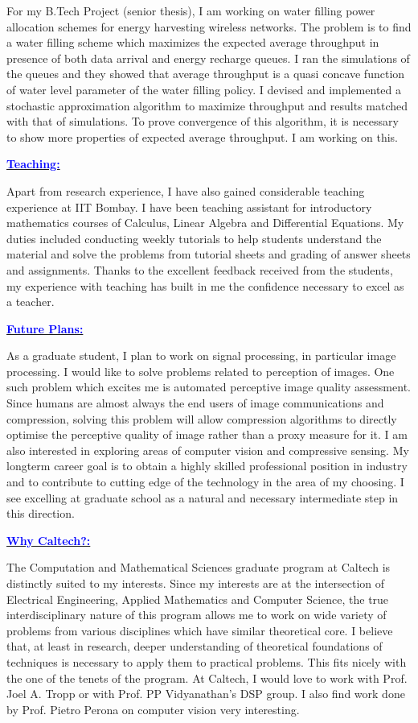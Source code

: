 \documentclass[11pt]{article}
\newcommand{\statement}[1]{\par\medskip
  \underline{\textcolor{blue}{\textbf{#1:}}}\space
}
\begin{document}
For my B.Tech Project (senior thesis), I am working on water filling power allocation schemes for energy harvesting wireless networks. 
The problem is to find a water filling scheme which maximizes the expected average throughput in presence of both data arrival and energy recharge queues. 
I ran the simulations of the queues and they showed that average throughput is a quasi concave function of water level parameter of the water filling policy. 
I devised and implemented a stochastic approximation algorithm to maximize throughput and results matched with that of simulations. 
To prove convergence of this algorithm, it is necessary to show more properties of expected average throughput. I am working on this.

\statement{Teaching}
Apart from research experience, I have also gained considerable teaching experience at IIT Bombay. 
I have been teaching assistant for introductory mathematics courses of Calculus, Linear Algebra and Differential Equations. 
My duties included conducting weekly tutorials to help students understand the material and solve the problems from tutorial sheets and grading of answer sheets and assignments.
Thanks to the excellent feedback received from the students, my experience with teaching has built in me the confidence necessary to excel as a teacher.

\statement{Future Plans}
As a graduate student, I plan to work on signal processing, in particular image processing. 
I would like to solve problems related to perception of images. One such problem which excites me is automated perceptive image quality assessment.
Since humans are almost always the end users of image communications and compression, solving this problem will allow compression algorithms to directly optimise the perceptive quality of image rather than a proxy measure for it. 
I am also interested in exploring areas of computer vision and compressive sensing. 
My longterm career goal is to obtain a highly skilled professional position in industry and to contribute to cutting edge of the technology in the area of my choosing. 
I see excelling at graduate school as a natural and necessary intermediate step in this direction.

\statement{Why Caltech?}
The Computation and Mathematical Sciences graduate program at Caltech is distinctly suited to my interests. 
Since my interests are at the intersection of Electrical Engineering, Applied Mathematics and Computer Science, the true interdisciplinary nature of this program allows me to work on wide variety of problems from various disciplines which have similar theoretical core. 
I believe that, at least in research, deeper understanding of theoretical foundations of techniques is necessary to apply them to practical problems. 
This fits nicely with the one of the tenets of the program. 
At Caltech, I would love to work with Prof. Joel A. Tropp or with Prof. PP Vidyanathan's DSP group. I also find work done by Prof. Pietro Perona on computer vision very interesting.
\end{document}

